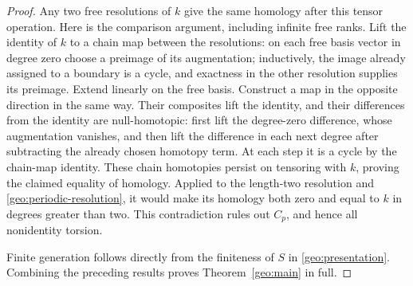 \begin{proof}
Any two free resolutions of $k$ give the same homology after this tensor
operation.  Here is the comparison argument, including infinite free
ranks.  Lift the identity of $k$ to a chain map between the resolutions:
on each free basis vector in degree zero choose a preimage of its
augmentation; inductively, the image already assigned to a boundary
is a cycle, and exactness in the other resolution supplies its preimage.
Extend linearly on the free basis.  Construct a map in the opposite
direction in the same way.  Their composites lift the identity, and
their differences from the identity are null-homotopic: first lift the
degree-zero difference, whose augmentation vanishes, and then lift the
difference in each next degree after subtracting the already chosen
homotopy term.  At each step it is a cycle by the chain-map identity.
These chain homotopies persist on tensoring with $k$, proving the claimed
equality of homology.  Applied to the length-two resolution and
\eqref{geo:periodic-resolution}, it would make its homology both zero
and equal to $k$ in degrees greater than two.  This contradiction rules
out $C_p$, and hence all nonidentity torsion.

Finite generation follows directly from the finiteness of $S$ in
\eqref{geo:presentation}.  Combining the preceding results proves
Theorem~\ref{geo:main} in full.
\end{proof}

